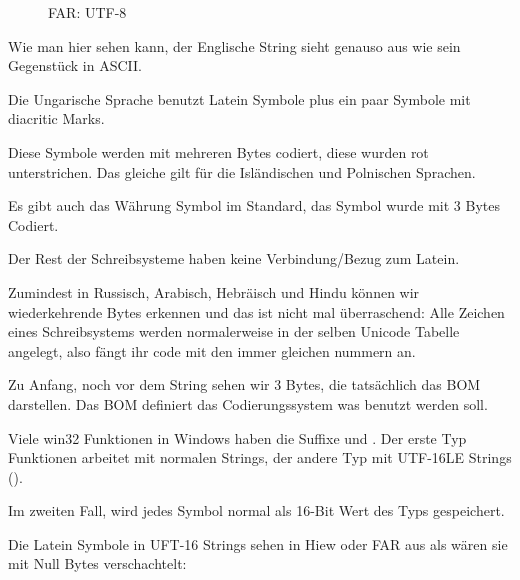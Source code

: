 \begin{figure}[H]
\centering
{}
\caption{FAR: UTF-8}
\end{figure}

Wie man hier sehen kann, der Englische String sieht genauso aus wie sein Gegenstück in ASCII.

Die Ungarische Sprache benutzt Latein Symbole plus ein paar Symbole mit diacritic Marks. %

Diese Symbole werden mit mehreren Bytes codiert, diese wurden rot unterstrichen.
Das gleiche gilt für die Isländischen und Polnischen Sprachen.

Es gibt auch das  Währung Symbol im Standard, das Symbol wurde mit 3 Bytes Codiert.

Der Rest der Schreibsysteme haben keine Verbindung/Bezug zum Latein. %

Zumindest in Russisch, Arabisch, Hebräisch und Hindu können wir wiederkehrende Bytes erkennen und das ist nicht mal überraschend:
Alle Zeichen eines Schreibsystems werden normalerweise in der selben Unicode Tabelle angelegt, also fängt ihr code mit den 
immer gleichen nummern an. %


Zu Anfang, noch vor dem  String sehen wir 3 Bytes, die tatsächlich das \ac{BOM} darstellen.
Das \ac{BOM} definiert das Codierungssystem was benutzt werden soll.


Viele win32 Funktionen in Windows haben die Suffixe  und . 
Der erste Typ Funktionen arbeitet mit normalen Strings, der andere Typ mit 
UTF-16LE Strings (). 

Im zweiten Fall, wird jedes Symbol normal als 16-Bit Wert des Typs  gespeichert.

Die Latein Symbole in UFT-16 Strings sehen in Hiew oder FAR aus als wären sie mit Null Bytes verschachtelt:


